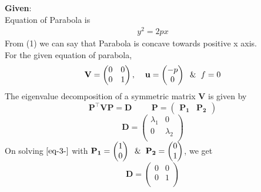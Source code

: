 \documentclass[10pt,a4paper]{report}
\newcommand{\myvec}[1]{\ensuremath{\begin{pmatrix}#1\end{pmatrix}}}
\let\vec\mathbf
\let\vec\mathbf
\begin{document}
\begin{multicols}{2}
\raggedright \textbf{Given}:\vspace{2mm}\\
Equation of Parabola is \\ \vspace{1mm}
\begin{align}
y^2 = 2px 
\end{align}
From (1) we can say that Parabola is concave towards positive x axis.\\
For the given equation of parabola,
	\begin{equation}
  \vec{V} = \begin{pmatrix}
          0 & 0 \\
          0 & 1 \\
          \end{pmatrix}, \hspace{4mm} \vec{u} = \myvec{-p \\ 0} \hspace{2mm} \& \hspace{2mm} f=0
 \label{eq-2-}
  \end{equation}
 The eigenvalue decomposition of a symmetric matrix $\vec{V}$ is given by
  \begin{equation}
  \vec{P}^{\top}\vec{V}\vec{P} = \vec{D} \hspace{1cm}
  \vec{P} = \myvec{\vec{P_1} & \vec{P_2}}                                                    \label{eq-3-} 
  \end{equation}
\begin{equation}
 \vec{D} = \begin{pmatrix}
          \lambda_1 & 0 \\
          0 & \lambda_2 \\
          \end{pmatrix}
  \label{eq-4-}
  \end{equation}
  On solving $\eqref{eq-3-}$ with $\vec{P_1} = \myvec{1 \\ 0} \hspace{2mm} \& \hspace{2mm} \vec{P_2} = \myvec{0 \\ 1}$, we get
  \begin{equation}
 \vec{D} = \begin{pmatrix}
         0 & 0 \\                                                                              0 & 1 \\                                                                              

\end{pmatrix}
\end{equation}
\end{multicols}
\end{document}
